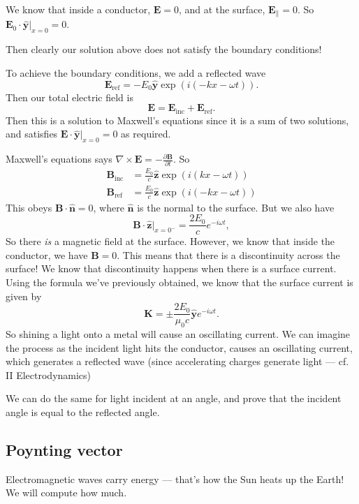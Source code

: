 \documentclass[a4paper]{article}
\begin{document}
We know that inside a conductor, $\mathbf{E} = 0$, and at the surface, $\mathbf{E}_{\parallel} = 0$. So $\mathbf{E}_0 \cdot \hat{\mathbf{y}}|_{x = 0} = 0$.

Then clearly our solution above does not satisfy the boundary conditions!

To achieve the boundary conditions, we add a reflected wave
\[
  \mathbf{E}_{\mathrm{ref}} = -E_0 \hat{\mathbf{y}} \exp(i(-kx - \omega t)).
\]
Then our total electric field is
\[
  \mathbf{E} = \mathbf{E}_{\mathrm{inc}} + \mathbf{E}_{\mathrm{ref}}.
\]
Then this is a solution to Maxwell's equations since it is a sum of two solutions, and satisfies $\mathbf{E}\cdot \hat{\mathbf{y}}|_{x = 0} = 0$ as required.

Maxwell's equations says $\nabla\times \mathbf{E} = -\frac{\partial \mathbf{B}}{\partial t}$. So
\begin{align*}
  \mathbf{B}_{\mathrm{inc}} &= \frac{E_0}{c}\hat{\mathbf{z}} \exp(i(kx - \omega t))\\
  \mathbf{B}_{\mathrm{ref}} &= \frac{E_0}{c}\hat{\mathbf{z}} \exp(i(-kx - \omega t))
\end{align*}
This obeys $\mathbf{B}\cdot \hat{\mathbf{n}} = 0$, where $\hat{\mathbf{n}}$ is the normal to the surface. But we also have
\[
  \mathbf{B}\cdot \hat{\mathbf{z}}|_{x = 0^-} = \frac{2E_0}{c}e^{-i\omega t},
\]
So there \emph{is} a magnetic field at the surface. However, we know that inside the conductor, we have $\mathbf{B} = 0$. This means that there is a discontinuity across the surface! We know that discontinuity happens when there is a surface current. Using the formula we've previously obtained, we know that the surface current is given by
\[
  \mathbf{K} = \pm\frac{2E_0}{\mu_0 c}\hat{\mathbf{y}} e^{-i \omega t}.
\]
So shining a light onto a metal will cause an oscillating current. We can imagine the process as the incident light hits the conductor, causes an oscillating current, which generates a reflected wave (since accelerating charges generate light --- cf. II Electrodynamics)

We can do the same for light incident at an angle, and prove that the incident angle is equal to the reflected angle.

\subsection{Poynting vector}
Electromagnetic waves carry energy --- that's how the Sun heats up the Earth! We will compute how much.
\end{document}
